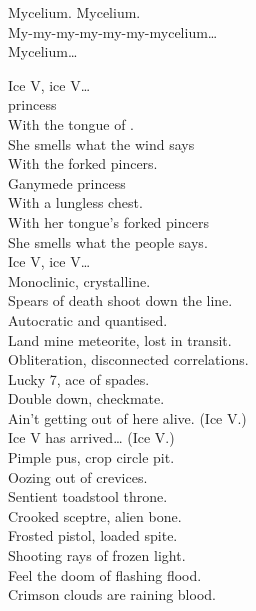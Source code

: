 Mycelium. Mycelium. \\
My-my-my-my-my-my-mycelium… \\
Mycelium… \\





Ice V, ice V… \\

 princess \\
With the tongue of . \\
She smells what the wind says \\
With the  forked pincers. \\

Ganymede princess \\
With a lungless chest. \\
With her tongue's forked pincers \\
She smells what the people says. \\

Ice V, ice V… \\

Monoclinic, crystalline. \\
Spears of death shoot down the line. \\
Autocratic and quantised. \\
Land mine meteorite, lost in transit. \\
Obliteration, disconnected correlations. \\
Lucky 7, ace of spades. \\
Double down, checkmate. \\

Ain't getting out of here alive. (Ice V.) \\
Ice V has arrived… (Ice V.) \\

Pimple pus, crop circle pit. \\
Oozing out of crevices. \\
Sentient toadstool throne. \\
Crooked sceptre, alien bone. \\
Frosted pistol, loaded spite. \\
Shooting rays of frozen light. \\
Feel the doom of flashing flood. \\
Crimson clouds are raining blood. \\


